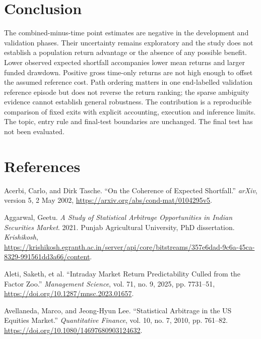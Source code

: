 \documentclass[11pt,a4paper]{article}
\begin{document}
\section*{Conclusion}

The combined-minus-time point estimates are negative in the development and validation phases. Their uncertainty remains exploratory and the study does not establish a population return advantage or the absence of any possible benefit. Lower observed expected shortfall accompanies lower mean returns and larger funded drawdown. Positive gross time-only returns are not high enough to offset the assumed reference cost. Path ordering matters in one end-labelled validation reference episode but does not reverse the return ranking; the sparse ambiguity evidence cannot establish general robustness. The contribution is a reproducible comparison of fixed exits with explicit accounting, execution and inference limits. The topic, entry rule and final-test boundaries are unchanged. The final test has not been evaluated.

\section*{References}

{\RaggedRight\hangindent=1.27cm\noindent Acerbi, Carlo, and Dirk Tasche. “On the Coherence of Expected Shortfall.” \textit{arXiv}, version 5, 2 May 2002, \url{https://arxiv.org/abs/cond-mat/0104295v5}.\par}\vspace{5pt}

{\RaggedRight\hangindent=1.27cm\noindent Aggarwal, Geetu. \textit{A Study of Statistical Arbitrage Opportunities in Indian Securities Market}. 2021. Punjab Agricultural University, PhD dissertation. \textit{Krishikosh}, \url{https://krishikosh.egranth.ac.in/server/api/core/bitstreams/357e6dad-9c6a-45ca-8329-991561dd3a66/content}.\par}\vspace{5pt}

{\RaggedRight\hangindent=1.27cm\noindent Aleti, Saketh, et al. “Intraday Market Return Predictability Culled from the Factor Zoo.” \textit{Management Science}, vol. 71, no. 9, 2025, pp. 7731--51, \url{https://doi.org/10.1287/mnsc.2023.01657}.\par}\vspace{5pt}

{\RaggedRight\hangindent=1.27cm\noindent Avellaneda, Marco, and Jeong-Hyun Lee. “Statistical Arbitrage in the US Equities Market.” \textit{Quantitative Finance}, vol. 10, no. 7, 2010, pp. 761–82. \url{https://doi.org/10.1080/14697680903124632}.\par}\vspace{5pt}
\end{document}
